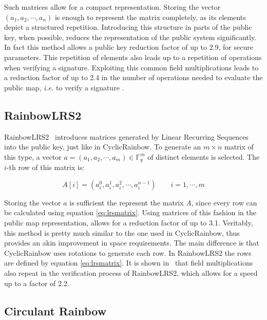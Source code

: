 \documentclass{ufsctex/ufsctex}
\begin{document}
Such matrices allow for a compact representation. Storing the vector $(a_1,
a_2, \cdots, a_n)$ is enough to represent the matrix completely, as its
elements depict a structured repetition. Introducing this structure in parts of
the public key, when possible, reduces the representation of the public system
significantly. In fact this method allows a public key reduction factor of up
to 2.9, for secure parameters. This repetition of elements also leads up to a
repetition of operations when verifying a signature. Exploiting this common
field multiplications leads to a reduction factor of up to 2.4 in the number of
operations needed to evaluate the public map, \textit{i.e.} to verify a
signature \cite{petzoldt2013thesis}.

\subsection{RainbowLRS2}

RainbowLRS2~\cite{petzoldt2013thesis} introduces matrices generated by Linear
Recurring Sequences into the public key, just like in CyclicRainbow. To
generate an $m \times n$ matrix of this type, a vector $a = (a_1, a_2, \cdots,
a_m) \in \mathbb{F}_q^m$ of distinct elements is selected. The $i$-th row of
this matrix is:

\begin{equation}\label{eq:lrsmatrix}
A[i] = (a_i^0, a_i^1, a_i^2, \cdots, a_i^{n-1}) \qquad i = 1, \cdots, m
\end{equation}

Storing the vector $a$ is sufficient the represent the matrix $A$, since every
row can be calculated using equation \ref{eq:lrsmatrix}. Using matrices of this
fashion in the public map representation, allows for a reduction factor of up
to 3.1. Veritably, this method is pretty much similar to the one used in
CyclicRainbow, thus provides an akin improvement in space requirements. The
main difference is that CyclicRainbow uses rotations to generate each row. In
RainbowLRS2 the rows are defined by equation \ref{eq:lrsmatrix}. It is shown
in~\cite{petzoldt2013thesis} that field multiplications also repeat in the
verification process of RainbowLRS2, which allows for a speed up to a factor of
2.2.

\subsection{Circulant Rainbow}
\end{document}
